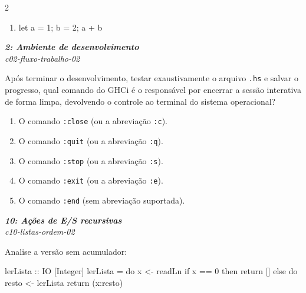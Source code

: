 \documentclass[a4paper,10pt,brazil]{article}
\begin{document}
\begin{multicols}{2}
\begin{enumerate}
  \item \begin{haskellcode}
let a = 1; b = 2; a + b
\end{haskellcode}


\end{enumerate}

\begin{flushright}
  \footnotesize
  \textit{\textbf{2: Ambiente de desenvolvimento}}\\
  \textit{c02-fluxo-trabalho-02}\\

\end{flushright}
Após terminar o desenvolvimento, testar exaustivamente o arquivo \texttt{.hs} e salvar o progresso, qual comando do GHCi é o responsável por encerrar a sessão interativa de forma limpa, devolvendo o controle ao terminal do sistema operacional?

\begin{enumerate}
  \item O comando \texttt{:close} (ou a abreviação \texttt{:c}).

  \item O comando \texttt{:quit} (ou a abreviação \texttt{:q}).

  \item O comando \texttt{:stop} (ou a abreviação \texttt{:s}).

  \item O comando \texttt{:exit} (ou a abreviação \texttt{:e}).

  \item O comando \texttt{:end} (sem abreviação suportada).


\end{enumerate}

\begin{flushright}
  \footnotesize
  \textit{\textbf{10: Ações de E/S recursivas}}\\
  \textit{c10-listas-ordem-02}\\

\end{flushright}
Analise a versão sem acumulador:

\begin{haskellcode}
lerLista :: IO [Integer]
lerLista = do
  x <- readLn
  if x == 0
    then return []
    else do
      resto <- lerLista
      return (x:resto)
\end{haskellcode}


\end{multicols}
\end{document}
